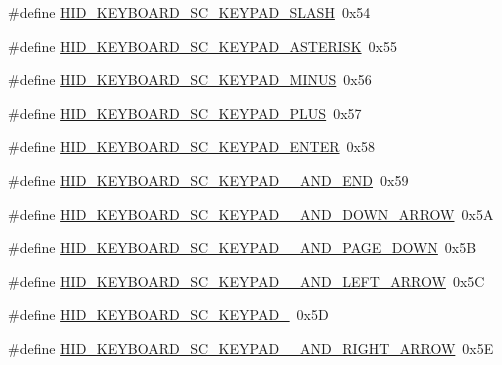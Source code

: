 \begin{DoxyCompactItemize}
\item 
\#define \hyperlink{group__Group__USBClassHIDCommon_ga219905aefe4fe5cc41e6a582def77b1d}{H\+I\+D\+\_\+\+K\+E\+Y\+B\+O\+A\+R\+D\+\_\+\+S\+C\+\_\+\+K\+E\+Y\+P\+A\+D\+\_\+\+S\+L\+A\+SH}~0x54
\item 
\#define \hyperlink{group__Group__USBClassHIDCommon_ga05d9d38fb9aae9a1da45c034bae11460}{H\+I\+D\+\_\+\+K\+E\+Y\+B\+O\+A\+R\+D\+\_\+\+S\+C\+\_\+\+K\+E\+Y\+P\+A\+D\+\_\+\+A\+S\+T\+E\+R\+I\+SK}~0x55
\item 
\#define \hyperlink{group__Group__USBClassHIDCommon_ga1a7c4031187578286502a2215d45b524}{H\+I\+D\+\_\+\+K\+E\+Y\+B\+O\+A\+R\+D\+\_\+\+S\+C\+\_\+\+K\+E\+Y\+P\+A\+D\+\_\+\+M\+I\+N\+US}~0x56
\item 
\#define \hyperlink{group__Group__USBClassHIDCommon_ga7a4038af21d203ca0499d4c93ce1a037}{H\+I\+D\+\_\+\+K\+E\+Y\+B\+O\+A\+R\+D\+\_\+\+S\+C\+\_\+\+K\+E\+Y\+P\+A\+D\+\_\+\+P\+L\+US}~0x57
\item 
\#define \hyperlink{group__Group__USBClassHIDCommon_ga28a5aa3b7b5a00ad07e2bbb4e20ce08b}{H\+I\+D\+\_\+\+K\+E\+Y\+B\+O\+A\+R\+D\+\_\+\+S\+C\+\_\+\+K\+E\+Y\+P\+A\+D\+\_\+\+E\+N\+T\+ER}~0x58
\item 
\#define \hyperlink{group__Group__USBClassHIDCommon_ga20eabf93bf7d72bd8605189370b8b38b}{H\+I\+D\+\_\+\+K\+E\+Y\+B\+O\+A\+R\+D\+\_\+\+S\+C\+\_\+\+K\+E\+Y\+P\+A\+D\+\_\+\_\+\+A\+N\+D\+\_\+\+E\+ND}~0x59
\item 
\#define \hyperlink{group__Group__USBClassHIDCommon_ga94da89ab01b9444ca5b29c6f9f050fb4}{H\+I\+D\+\_\+\+K\+E\+Y\+B\+O\+A\+R\+D\+\_\+\+S\+C\+\_\+\+K\+E\+Y\+P\+A\+D\+\_\+\_\+\+A\+N\+D\+\_\+\+D\+O\+W\+N\+\_\+\+A\+R\+R\+OW}~0x5A
\item 
\#define \hyperlink{group__Group__USBClassHIDCommon_ga3c3af37d9735cd890552ca8221597b18}{H\+I\+D\+\_\+\+K\+E\+Y\+B\+O\+A\+R\+D\+\_\+\+S\+C\+\_\+\+K\+E\+Y\+P\+A\+D\+\_\+\_\+\+A\+N\+D\+\_\+\+P\+A\+G\+E\+\_\+\+D\+O\+WN}~0x5B
\item 
\#define \hyperlink{group__Group__USBClassHIDCommon_gaa66bb7220260237da83d4df4d8c394ea}{H\+I\+D\+\_\+\+K\+E\+Y\+B\+O\+A\+R\+D\+\_\+\+S\+C\+\_\+\+K\+E\+Y\+P\+A\+D\+\_\+\_\+\+A\+N\+D\+\_\+\+L\+E\+F\+T\+\_\+\+A\+R\+R\+OW}~0x5C
\item 
\#define \hyperlink{group__Group__USBClassHIDCommon_ga6b00bc233e4ed5379b41566e90680329}{H\+I\+D\+\_\+\+K\+E\+Y\+B\+O\+A\+R\+D\+\_\+\+S\+C\+\_\+\+K\+E\+Y\+P\+A\+D\+\_}~0x5D
\item 
\#define \hyperlink{group__Group__USBClassHIDCommon_ga91ae9f39c778172a0edc615efe9982b1}{H\+I\+D\+\_\+\+K\+E\+Y\+B\+O\+A\+R\+D\+\_\+\+S\+C\+\_\+\+K\+E\+Y\+P\+A\+D\+\_\+\_\+\+A\+N\+D\+\_\+\+R\+I\+G\+H\+T\+\_\+\+A\+R\+R\+OW}~0x5E

\end{DoxyCompactItemize}
